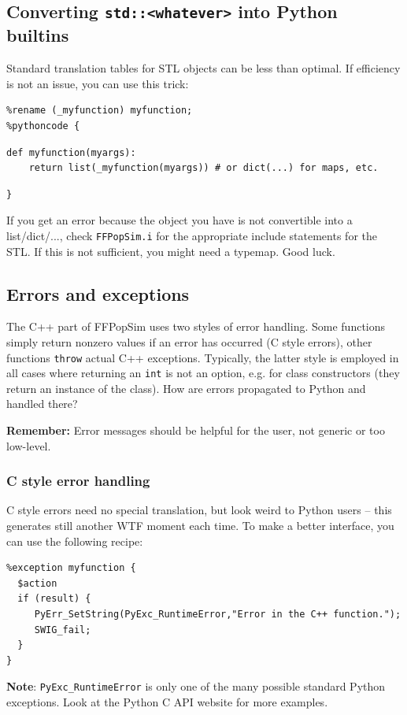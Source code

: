 \documentclass[12pt,a4paper,notitlepage,onecolumn]{article}
\begin{document}
\subsection{Converting \texttt{std::<whatever>} into Python builtins}
Standard translation tables for STL objects can be less than optimal. If
efficiency is not an issue, you can use this trick:
\begin{verbatim}
%rename (_myfunction) myfunction;
%pythoncode {
\end{verbatim}
\vspace{-4ex}
\begin{verbatim}
def myfunction(myargs):
    return list(_myfunction(myargs)) # or dict(...) for maps, etc.
\end{verbatim}
\vspace{-4ex}
\begin{verbatim}
}
\end{verbatim}
If you get an error because the object you have is not convertible into a
list/dict/..., check \texttt{FFPopSim.i} for the appropriate include statements
for the STL. If this is not sufficient, you might need a typemap. Good luck.

\subsection{Errors and exceptions}
The C++ part of FFPopSim uses two styles of error handling. Some functions
simply return nonzero values if an error has occurred (C style errors), other
functions \texttt{throw} actual C++ exceptions. Typically, the latter style is
employed in all cases where returning an \texttt{int} is not an option, e.g. for
class constructors (they return an instance of the class). How are errors
propagated to Python and handled there?

\begin{framed}
\noindent \textbf{Remember:} Error messages should be helpful for the user, not
generic or too low-level.
\end{framed}

\subsubsection*{C style error handling}
C style errors need no special translation, but look weird to Python users -- this
generates still another WTF moment each time. To make a better interface, you
can use the following recipe:
\begin{verbatim}
%exception myfunction {
  $action
  if (result) {
     PyErr_SetString(PyExc_RuntimeError,"Error in the C++ function.");
     SWIG_fail;
  }
}
\end{verbatim}
\textbf{Note}: \texttt{PyExc\_RuntimeError} is only one of the many possible
standard Python exceptions. Look at the Python C API website for more examples.
\end{document}
